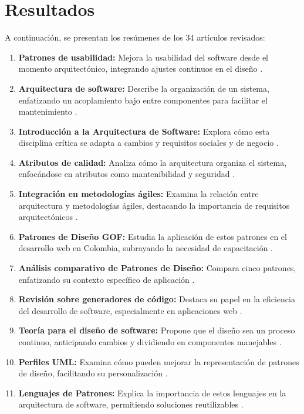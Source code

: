 \documentclass[twocolumn]{article}
\begin{document}
\section{Resultados}
A continuación, se presentan los resúmenes de los 34 artículos revisados:
\begin{enumerate}
    \item \textbf{Patrones de usabilidad:} Mejora la usabilidad del software desde el momento arquitectónico, integrando ajustes continuos en el diseño \cite{moreno2003}.
    \item \textbf{Arquitectura de software:} Describe la organización de un sistema, enfatizando un acoplamiento bajo entre componentes para facilitar el mantenimiento \cite{romero2006}.
    \item \textbf{Introducción a la Arquitectura de Software:} Explora cómo esta disciplina crítica se adapta a cambios y requisitos sociales y de negocio \cite{cristia2008}.
    \item \textbf{Atributos de calidad:} Analiza cómo la arquitectura organiza el sistema, enfocándose en atributos como mantenibilidad y seguridad \cite{bastarrica2005}.
    \item \textbf{Integración en metodologías ágiles:} Examina la relación entre arquitectura y metodologías ágiles, destacando la importancia de requisitos arquitectónicos \cite{navarro2017}.
    \item \textbf{Patrones de Diseño GOF:} Estudia la aplicación de estos patrones en el desarrollo web en Colombia, subrayando la necesidad de capacitación \cite{guerrero2013}.
    \item \textbf{Análisis comparativo de Patrones de Diseño:} Compara cinco patrones, enfatizando su contexto específico de aplicación \cite{alvarez2022}.
    \item \textbf{Revisión sobre generadores de código: }Destaca su papel en la eficiencia del desarrollo de software, especialmente en aplicaciones web \cite{casas2020}.
    \item \textbf{Teoría para el diseño de software:} Propone que el diseño sea un proceso continuo, anticipando cambios y dividiendo en componentes manejables \cite{cristia2021}.
    \item \textbf{Perfiles UML:} Examina cómo pueden mejorar la representación de patrones de diseño, facilitando su personalización \cite{garis2006}.
    \item \textbf{Lenguajes de Patrones:} Explica la importancia de estos lenguajes en la arquitectura de software, permitiendo soluciones reutilizables \cite{jimenez2014}.

\end{enumerate}
\end{document}
